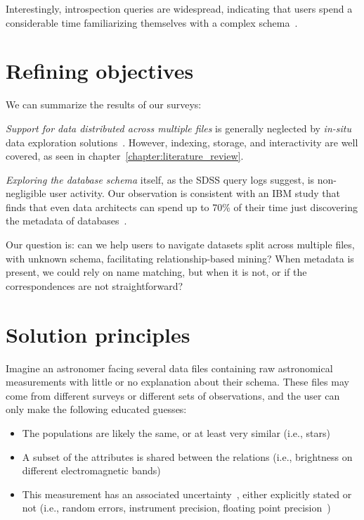 Interestingly, introspection queries are widespread, indicating that users spend a considerable time
familiarizing themselves with a complex schema~\cite{Khoussainova2010}.

\section{Refining objectives}
\label{sec:objectives}

We can summarize the results of our surveys:

\emph{Support for data distributed across multiple files} is generally neglected by
\emph{in-situ} data exploration solutions~\cite{Silva2016}. However, indexing, storage, and
interactivity are well covered, as seen in chapter~\ref{chapter:literature_review}.

\emph{Exploring the database schema} itself, as the \gls{SDSS} query logs suggest, is
non-negligible user activity. Our observation is consistent with an IBM study that finds
that even data architects can spend up to 70\% of their time just discovering the metadata of
databases~\cite{Wu2008}.

Our question is: can we help users to navigate datasets split across multiple
files, with unknown schema, facilitating relationship-based mining?
When metadata is present, we could rely on name matching, but when it is not, or if the
correspondences are not straightforward?

\section{Solution principles}
\label{sec:gaps/principles}

Imagine an astronomer facing several data files containing raw astronomical measurements
with little or no explanation about their schema. These files may come from different
surveys or different sets of observations, and the user can only make the following
educated guesses:

\begin{itemize}
    \item The populations are likely the same, or at least very similar (i.e., stars)
    \item A subset of the attributes is shared between the relations (i.e., brightness
        on different electromagnetic bands)
    \item This measurement has an associated uncertainty~\cite{Stonebraker2009}, either
        explicitly stated or not (i.e., random errors, instrument precision, floating point 
        precision~\cite{dawson2008comparing})
\end{itemize}

